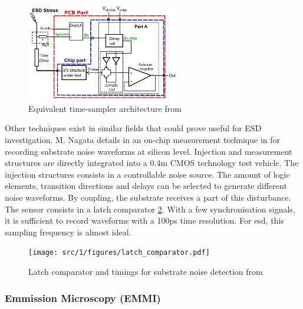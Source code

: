 \begin{figure}[!h]
  \centering
  \includegraphics[width=0.6\textwidth]{src/1/figures/architecture_equivalent_time_sampler.png}
  \caption{Equivalent time-sampler architecture from \cite{eq-time-sampling}}
  \label{fig:eq-time-sampler-architecture}
\end{figure}

Other techniques exist in similar fields that could prove useful for ESD investigation.
M. Nagata details in \cite{substrate-noise-measurement} an on-chip measurement technique in for recording substrate noise waveforms at silicon level.
Injection and measurement structures are directly integrated into a 0.4\textmu{}m CMOS technology test vehicle.
The injection structures consists in a controllable noise source.
The amount of logic elements, transition directions and delays can be selected to generate different noise waveforms.
By coupling, the substrate receives a part of this disturbance.
The sensor consists in a latch comparator \ref{fig:noise-detect-latch-comparator}.
With a few synchronisation signals, it is sufficient to record waveforms with a 100ps time resolution.
For \gls{esd}, this sampling frequency is almost ideal.

\begin{figure}[!h]
  \centering
  \texttt{[image: src/1/figures/latch\_comparator.pdf]}
  \caption{Latch comparator and timings for substrate noise detection from \cite{}}
  \label{fig:noise-detect-latch-comparator}
\end{figure}


\subsubsection{Emmission Microscopy (EMMI)}

